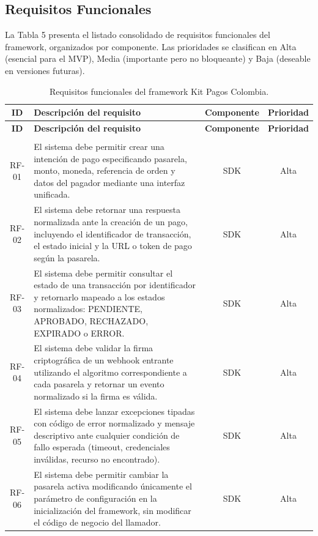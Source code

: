 \documentclass[10pt]{article}
\begin{document}
\subsection{Requisitos Funcionales}

La Tabla 5 presenta el listado consolidado de requisitos funcionales del framework, organizados por componente. Las prioridades se clasifican en Alta (esencial para el MVP), Media (importante pero no bloqueante) y Baja (deseable en versiones futuras).

\begin{center}
\renewcommand{\arraystretch}{1.2}
\begin{longtable}{|c|p{8.5cm}|c|c|}
  \hline
  \textbf{ID} & \textbf{Descripción del requisito} & \textbf{Componente} & \textbf{Prioridad} \\
  \hline
  \endfirsthead
  \hline
  \textbf{ID} & \textbf{Descripción del requisito} & \textbf{Componente} & \textbf{Prioridad} \\
  \hline
  \endhead
  \hline
  \endfoot
  \hline
  \caption{Requisitos funcionales del framework Kit Pagos Colombia.}
  \label{tab:requisitos-funcionales}\\
  \endlastfoot
  RF-01 & El sistema debe permitir crear una intención de pago especificando pasarela, monto, moneda, referencia de orden y datos del pagador mediante una interfaz unificada. & SDK & Alta \\
  \hline
  RF-02 & El sistema debe retornar una respuesta normalizada ante la creación de un pago, incluyendo el identificador de transacción, el estado inicial y la URL o token de pago según la pasarela. & SDK & Alta \\
  \hline
  RF-03 & El sistema debe permitir consultar el estado de una transacción por identificador y retornarlo mapeado a los estados normalizados: PENDIENTE, APROBADO, RECHAZADO, EXPIRADO o ERROR. & SDK & Alta \\
  \hline
  RF-04 & El sistema debe validar la firma criptográfica de un webhook entrante utilizando el algoritmo correspondiente a cada pasarela y retornar un evento normalizado si la firma es válida. & SDK & Alta \\
  \hline
  RF-05 & El sistema debe lanzar excepciones tipadas con código de error normalizado y mensaje descriptivo ante cualquier condición de fallo esperada (timeout, credenciales inválidas, recurso no encontrado). & SDK & Alta \\
  \hline
  RF-06 & El sistema debe permitir cambiar la pasarela activa modificando únicamente el parámetro de configuración en la inicialización del framework, sin modificar el código de negocio del llamador. & SDK & Alta \\

\end{longtable}
\end{center}
\end{document}
